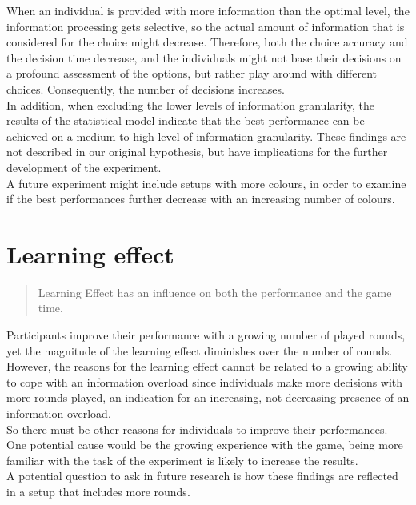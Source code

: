 When an individual is provided with more information than the optimal level, the information processing gets selective, so the actual amount of information that is considered for the choice might decrease. Therefore, both the choice accuracy and the decision time decrease, and the individuals might not base their decisions on a profound assessment of the options, but rather play around with different choices. Consequently, the number of decisions increases.\\
In addition, when excluding the lower levels of information granularity, the results of the statistical model indicate that the best performance can be achieved on a medium-to-high level of information granularity. These findings are not described in our original hypothesis, but have implications for the further development of the experiment.\\
A future experiment might include setups with more colours, in order to examine if the best performances further decrease with an increasing number of colours. 



\section{Learning effect}
\begin{quote}
Learning Effect has an influence on both the performance and the game time. 
\end{quote}
Participants improve their performance with a growing number of played rounds, yet the magnitude of the learning effect diminishes over the number of rounds. However, the reasons for the learning effect cannot be related to a growing ability to cope with an information overload since individuals make more decisions with more rounds played, an indication for an increasing, not decreasing presence of an information overload. \\
So there must be other reasons for individuals to improve their performances. One potential cause would be the growing experience with the game, being more familiar with the task of the experiment is likely to increase the results.\\
A potential question to ask in future research is how these findings are reflected in a setup that includes more rounds.

